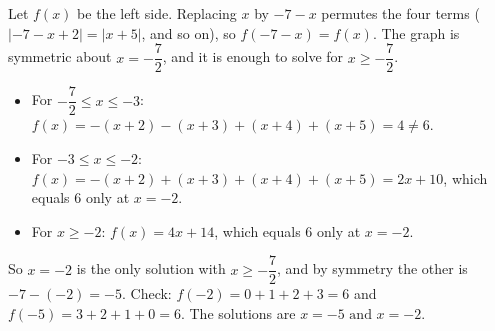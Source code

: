 Let $f(x)$ be the left side. Replacing $x$ by $-7-x$ permutes the four terms ($|-7-x+2|=|x+5|$, and so on), so $f(-7-x)=f(x)$. The graph is symmetric about $x=-\dfrac72$, and it is enough to solve for $x\ge-\dfrac72$.
\begin{itemize}
\item For $-\dfrac72\le x\le-3$: $f(x)=-(x+2)-(x+3)+(x+4)+(x+5)=4\ne6$.
\item For $-3\le x\le-2$: $f(x)=-(x+2)+(x+3)+(x+4)+(x+5)=2x+10$, which equals $6$ only at $x=-2$.
\item For $x\ge-2$: $f(x)=4x+14$, which equals $6$ only at $x=-2$.
\end{itemize}
So $x=-2$ is the only solution with $x\ge-\dfrac72$, and by symmetry the other is $-7-(-2)=-5$. Check: $f(-2)=0+1+2+3=6$ and $f(-5)=3+2+1+0=6$. The solutions are $\boxed{x=-5\text{ and }x=-2}$.
